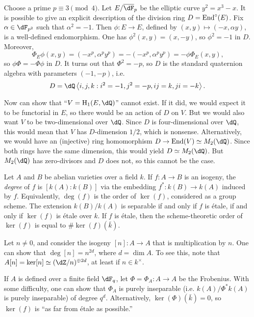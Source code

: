 \documentclass{article}
\begin{document}
\begin{example}[Serre]
Choose a prime $p\equiv 3\pmod 4$. Let $E/\overline\dF_p$ be the elliptic 
curve $y^2=x^3-x$. It is possible to give an explicit description of the 
division ring $D=\operatorname{End}^\circ(E)$. Fix $\alpha\in \dF_{p^2}$ such that 
$\alpha^2=-1$. Then $\phi:E\to E$, defined by $(x,y)\mapsto (-x,\alpha y)$, is 
a well-defined endomorphism. One has $\phi^2(x,y)=(x,-y)$, so $\phi^2=-1$ in 
$D$. Moreover, 
\[
  \Phi_E\phi(x,y) = (-x^p, \alpha^p y^p) = -(-x^p, \alpha^p y^p) = -\phi \Phi_E(x,y) \text{,}
\]
so $\phi \Phi=-\Phi \phi$ in $D$. It turns out that $\Phi^2=-p$, so $D$ is the 
standard quaternion algebra with parameters $(-1,-p)$, i.e.  
\[
  D = \dQ\left\langle i,j,k : i^2=-1,j^2=-p,i j=k, j i=-k\right\rangle \text{.}
\]
\end{example}

Now can show that ``$V=\h_1(E,\dQ)$'' cannot exist. If it did, we would expect 
it to be functorial in $E$, so there would be an action of $D$ on $V$. But we 
would also want $V$ to be two-dimensional over $\dQ$. Since $D$ is 
four-dimensional over $\dQ$, this would mean that $V$ has $D$-dimension $1/2$, 
which is nonsense. Alternatively, we would have an (injective) ring 
homomorphism $D\to \End(V)\simeq M_2(\dQ)$. Since both rings have the same 
dimension, this would yield $D\simeq M_2(\dQ)$. But $M_2(\dQ)$ has 
zero-divisors and $D$ does not, so this cannot be the case. 






Let $A$ and $B$ be abelian varieties over a field $k$. If $f:A\to B$ is an 
isogeny, the \emph{degree} of $f$ is $[k(A):k(B)]$ via the embedding 
$f^\ast:k(B) \to k(A)$ induced by $f$. Equivalently, $\deg(f)$ is the order 
of $\ker(f)$, considered as a group scheme. The extension $k(B)/k(A)$ is 
separable if and only if $f$ is \'etale, if and only if $\ker(f)$ is \'etale 
over $k$. If $f$ is \'etale, then the scheme-theoretic order of $\ker(f)$ is 
equal to $\# \ker (f)(\bar k)$. 

\begin{example}
Let $n\ne 0$, and consider the isogeny $[n]:A\to A$ that is multiplication by 
$n$. One can show that $\deg[n]=n^{2 d}$, where $d=\dim A$. To see this,  note 
that $A[n]=\ker[n]\simeq (\dZ/n)^{\oplus 2 d}$, at least if $n\in k^\times$. 
\end{example}

\begin{example}
If $A$ is defined over a finite field $\dF_q$, let $\Phi=\Phi_A:A\to A$ be the 
Frobenius. With some difficulty, one can show that $\Phi_A$ is purely 
inseparable (i.e. $k(A)/\Phi^\ast k(A)$ is purely inseparable) of degree 
$q^d$. Alternatively, $\ker(\Phi)(\bar k)=0$, so $\ker(f)$ is ``as far from 
\'etale as possible.'' 
\end{example}
\end{document}
